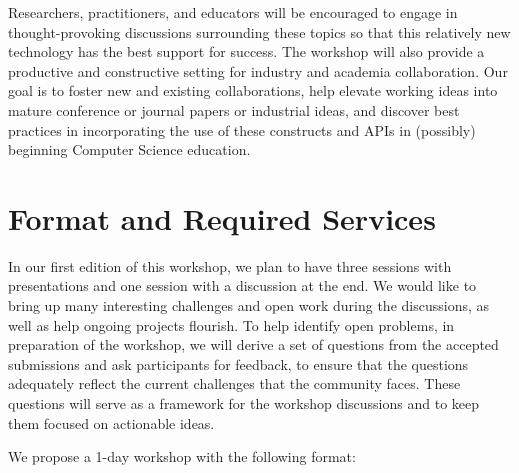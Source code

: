 \documentclass[10pt, conference]{IEEEtran}
\begin{document}
Researchers, practitioners, and educators will be encouraged to engage in thought-provoking discussions surrounding these topics so that this relatively new technology has the best support for success. The workshop will also provide a productive and constructive setting for industry and academia collaboration. Our goal is to foster new and existing collaborations, help elevate working ideas into mature conference or journal papers or industrial ideas, and discover best practices in incorporating the use of these constructs and APIs in (possibly) beginning Computer Science education.

\section{Format and Required Services}


In our first edition of this workshop, we plan to have three sessions with presentations and one session with a discussion at the end. We would like to bring up many interesting challenges and open work during the discussions, as well as help ongoing projects flourish. To help identify open problems, in preparation of the workshop, we will derive a set of questions from the accepted submissions and ask participants for feedback, to ensure that the questions adequately reflect the current challenges that the community faces. These questions will serve as a framework for the workshop discussions and to keep them focused on actionable ideas. 

We propose a 1-day workshop with the following format:
\end{document}
